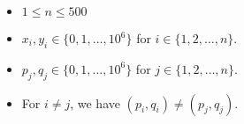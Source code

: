\begin{itemize}
	\tightlist
	\item $1 \le n \le 500$
	\item $x_i,y_i\in\{0,1,\dots,10^6\}$ for $i\in \{1,2,\dots,n\}$.
	\item $p_j,q_j\in\{0,1,\dots,10^6\}$ for $j\in \{1,2,\dots,n\}$.
    \item For $i\neq j$, we have $(p_i,q_i)\neq (p_j,q_j)$.
\end{itemize}

